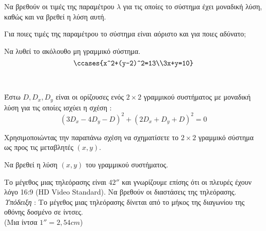 \documentclass[ektypwsh]{frontisthrio-diag}
\begin{document}
\begin{thema}
\begin{erwthma}
\begin{alist}
\item Να βρεθούν οι τιμές της παραμέτρου $ \lambda $ για τις οποίες το σύστημα έχει μοναδική λύση, καθώς και να βρεθεί η λύση αυτή.
\item Για ποιες τιμές της παραμέτρου το σύστημα είναι αόριστο και για ποιες αδύνατο;
\end{alist}
\item Να λυθεί το ακόλουθο μη γραμμικό σύστημα.
\[ \ccases{x^2+(y-2)^2=13\\3x+y=10} \]
\end{erwthma}
\item\mbox{}\\\vspace{-7mm}
\begin{erwthma}
\item Έστω $ D,D_x,D_y $ είναι οι ορίζουσες ενός $ 2\times2 $ γραμμικού συστήματος με μοναδική λύση για τις οποίες ισχύει η σχέση :
\[ \left( 3D_x-4D_y-D\right) ^2+\left( 2D_x+D_y+D\right) ^2=0\]
\begin{alist}
\item Χρησιμοποιώντας την παραπάνω σχέση να σχηματίσετε το $ 2\times2 $ γραμμικό σύστημα ως προς τις μεταβλητές $ (x,y) $.\\
\item Να βρεθεί η λύση $ (x,y) $ του γραμμικού συστήματος.
\end{alist}
\item Το μέγεθος μιας τηλεόρασης είναι $ 42'' $ και γνωρίζουμε επίσης ότι οι πλευρές έχουν λόγο 16:9 (HD Video Standard). Να βρεθούν οι διαστάσεις της τηλεόρασης.\\
{\footnotesize \textit{Υπόδειξη} : Το μέγεθος μιας τηλεόρασης δίνεται από το μήκος της διαγωνίου της οθόνης δοσμένο σε ίντσες.\\(Μια ίντσα $ 1''=2{,}54cm $)}
\end{erwthma}
\end{thema}
\end{document}

